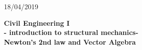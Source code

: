 \documentclass[10pt,a4j]{article}
\newlength{\minitwocolumn}
\begin{document}
\newcommand{\fat}[1]{\mbox{\boldmath $#1$}}
\newcommand{\D}{\partial}
\newcommand{\w}{\omega}
\newcommand{\ga}{\alpha}
\newcommand{\gb}{\beta}
\newcommand{\gx}{\xi}
\newcommand{\gz}{\zeta}
\newcommand{\vhat}[1]{\hat{\fat{#1}}}
\newcommand{\spc}{\vspace{0.7\baselineskip}}
\newcommand{\halfspc}{\vspace{0.3\baselineskip}}

\newcommand{\twofig}[2]
 {
   \begin{figure}
     \begin{minipage}[t]{\minitwocolumn}
         \begin{center}   #1
         \end{center}
     \end{minipage}
         \hspace{\columnsep}
     \begin{minipage}[t]{\minitwocolumn}
         \begin{center} #2
         \end{center}
     \end{minipage}
   \end{figure}
 }
\begin{flushright}
	18/04/2019
\end{flushright}
\begin{center}
	{\Large \bf Civil Engineering I \\
	- introduction to structural mechanics-\\
	Newton's 2nd law and Vector Algebra 
	}  \\
\end{center}
\vspace{1.5cm}
\end{document}

